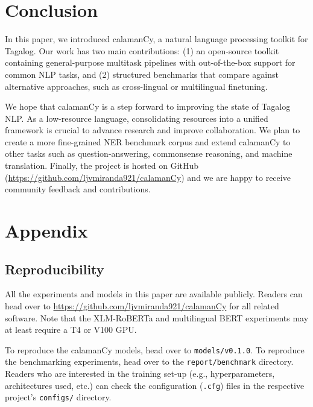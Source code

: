 \documentclass[11pt]{article}
\begin{document}
\section{Conclusion}

In this paper, we introduced calamanCy, a natural language processing toolkit for Tagalog.
Our work has two main contributions: (1) an open-source toolkit containing general-purpose multitask pipelines with out-of-the-box support for common NLP tasks, and
(2) structured benchmarks that compare against alternative approaches, such as cross-lingual or multilingual finetuning. 

We hope that calamanCy is a step forward to improving the state of Tagalog NLP. 
As a low-resource language, consolidating resources into a unified framework is crucial to advance research and improve collaboration.
We plan to create a more fine-grained NER benchmark corpus and extend calamanCy to other tasks such as question-answering, commonsense reasoning, and machine translation.
Finally, the project is hosted on GitHub (\url{https://github.com/ljvmiranda921/calamanCy}) and we are happy to receive community feedback and contributions.

\newpage



\appendix

\section{Appendix}

\subsection{Reproducibility}


All the experiments and models in this paper are available publicly. 
Readers can head over to \url{https://github.com/ljvmiranda921/calamanCy} for all related software.
Note that the XLM-RoBERTa and multilingual BERT experiments may at least require a T4 or V100 GPU.

To reproduce the calamanCy models, head over to \texttt{models/v0.1.0}.
To reproduce the benchmarking experiments, head over to the \texttt{report/benchmark} directory.
Readers who are interested in the training set-up (e.g., hyperparameters, architectures used, etc.) can check the configuration (\texttt{.cfg}) files in the respective project's \texttt{configs/} directory.
\end{document}
